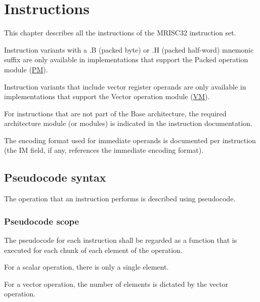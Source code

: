 %

\chapter{Instructions}

This chapter describes all the instructions of the MRISC32 instruction set.

Instruction variants with a .B (packed byte) or .H (packed half-word) mnemonic
suffix are only available in implementations that support the Packed operation
module (\hyperref[module:PM]{PM}).

Instruction variants that include vector register operands are only available
in implementations that support the Vector operation module
(\hyperref[module:VM]{VM}).

For instructions that are not part of the Base architecture, the required
architecture module (or modules) is indicated in the instruction documentation.

The encoding format used for immediate operands is documented per instruction
(the IM field, if any, references the immediate encoding format).

\section{Pseudocode syntax}

The operation that an instruction performs is described using pseudocode.

\subsection{Pseudocode scope}

The pseudocode for each instruction shall be regarded as a function that is
executed for each chunk of each element of the operation.

For a scalar operation, there is only a single element.

For a vector operation, the number of elements is dictated by the vector
operation.

